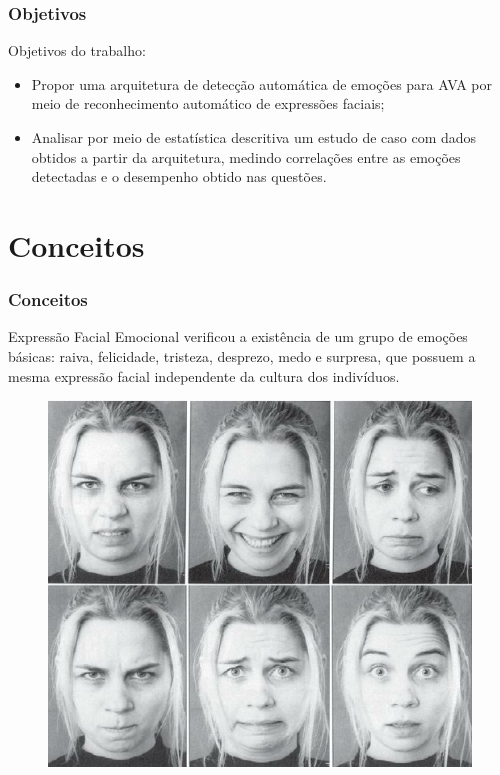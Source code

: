 \documentclass{beamer}
\begin{document}
\begin{frame}
\frametitle{Objetivos}
\begin{block}{Objetivos do trabalho:}
\begin{itemize}
\pause
\item Propor uma arquitetura de detec\c{c}\~ao autom\'atica de emo\c{c}\~oes para AVA por meio de reconhecimento autom\'atico de express\~oes faciais;
\pause
\item Analisar por meio de estat\'istica descritiva um estudo de caso com dados obtidos a partir da arquitetura, 
medindo correla\c{c}\~oes entre as emo\c{c}\~oes detectadas e o desempenho obtido nas quest\~oes.
\end{itemize}
\end{block}
\end{frame}


\section{Conceitos}
\begin{frame}
\frametitle{Conceitos}
\pause
\begin{block}{Express\~ao Facial Emocional}
\cite{ekman1994} verificou a exist\^encia de um grupo de emo\c{c}\~oes b\'asicas: raiva, felicidade, tristeza, desprezo, medo e surpresa, 
que possuem a mesma express\~ao facial independente da cultura dos indiv\'iduos.
\end{block}

\begin{figure}
\centering
\includegraphics[scale=0.27]{figuras/ekman-emotions.png}
\end{figure}

\end{frame}
\end{document}
